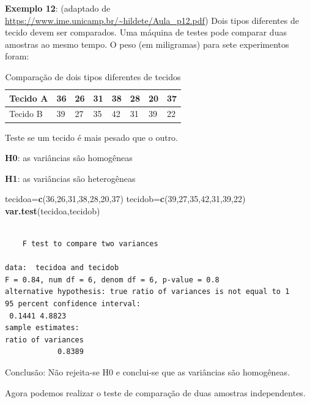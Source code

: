 \documentclass[12pt,portuguese,oneside]{book}
\newenvironment{Shaded}{\begin{snugshade}}{\end{snugshade}}
\newcommand{\KeywordTok}[1]{\textcolor[rgb]{0.13,0.29,0.53}{\textbf{#1}}}
\newcommand{\DecValTok}[1]{\textcolor[rgb]{0.00,0.00,0.81}{#1}}
\newcommand{\NormalTok}[1]{#1}
\begin{document}
\textbf{Exemplo 12}: (adaptado de
\url{https://www.ime.unicamp.br/~hildete/Aula_p12.pdf}) Dois tipos
diferentes de tecido devem ser comparados. Uma máquina de testes pode
comparar duas amostras ao mesmo tempo. O peso (em miligramas) para sete
experimentos foram:

\begin{table}

\caption{\label{tab:unnamed-chunk-113}Comparação de dois tipos diferentes de tecidos}
\centering
\begin{tabular}[t]{l|l|l|l|l|l|l|l}
\hline
Tecido A & 36 & 26 & 31 & 38 & 28 & 20 & 37\\
\hline
Tecido B & 39 & 27 & 35 & 42 & 31 & 39 & 22\\
\hline
\end{tabular}
\end{table}

Teste se um tecido é mais pesado que o outro.

\textbf{H0}: as variâncias são homogêneas

\textbf{H1}: as variâncias são heterogêneas

\begin{Shaded}
\begin{Highlighting}[]
\NormalTok{tecidoa=}\KeywordTok{c}\NormalTok{(}\DecValTok{36}\NormalTok{,}\DecValTok{26}\NormalTok{,}\DecValTok{31}\NormalTok{,}\DecValTok{38}\NormalTok{,}\DecValTok{28}\NormalTok{,}\DecValTok{20}\NormalTok{,}\DecValTok{37}\NormalTok{)}
\NormalTok{tecidob=}\KeywordTok{c}\NormalTok{(}\DecValTok{39}\NormalTok{,}\DecValTok{27}\NormalTok{,}\DecValTok{35}\NormalTok{,}\DecValTok{42}\NormalTok{,}\DecValTok{31}\NormalTok{,}\DecValTok{39}\NormalTok{,}\DecValTok{22}\NormalTok{)}
\KeywordTok{var.test}\NormalTok{(tecidoa,tecidob)}
\end{Highlighting}
\end{Shaded}

\begin{verbatim}

    F test to compare two variances

data:  tecidoa and tecidob
F = 0.84, num df = 6, denom df = 6, p-value = 0.8
alternative hypothesis: true ratio of variances is not equal to 1
95 percent confidence interval:
 0.1441 4.8823
sample estimates:
ratio of variances 
            0.8389 
\end{verbatim}

Conclusão: Não rejeita-se H0 e conclui-se que as variâncias são
homogêneas.

Agora podemos realizar o teste de comparação de duas amostras
independentes.
\end{document}
